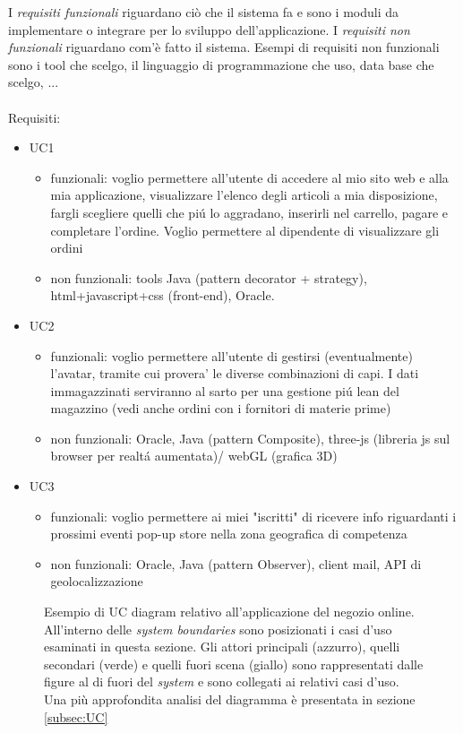 \documentclass[12pt]{article}
\begin{document}
I {\em requisiti funzionali} riguardano ciò che il sistema fa e sono i moduli da implementare o integrare per lo sviluppo dell’applicazione.
I {\em requisiti non funzionali} riguardano com’è fatto il sistema. Esempi di requisiti non funzionali sono i tool che scelgo, il linguaggio di programmazione che uso, data base che scelgo, ...
\\
\\
Requisiti:
\begin{itemize}
	\item UC1
		\begin{itemize}
		\item funzionali: voglio permettere all'utente di accedere al mio sito web e alla mia applicazione, visualizzare l'elenco degli articoli a mia disposizione, fargli scegliere quelli che pi\'u lo aggradano, inserirli nel carrello, pagare e completare l'ordine. Voglio permettere al dipendente di visualizzare gli ordini 
		\item non funzionali: tools Java (pattern decorator + strategy), html+javascript+css (front-end), Oracle. 
		\end{itemize}
	\item UC2
		\begin{itemize}
		\item funzionali: voglio permettere all'utente di gestirsi (eventualmente) l'avatar, tramite cui provera' le diverse combinazioni di capi. I dati immagazzinati serviranno al sarto per una gestione pi\'u lean del magazzino (vedi anche ordini con i fornitori di materie prime)
		\item non funzionali: Oracle, Java (pattern Composite), three-js (libreria js sul browser per realt\'a aumentata)/ webGL (grafica 3D)
		\end{itemize}
	\item UC3
		\begin{itemize}
		\item funzionali: voglio permettere ai miei "iscritti" di ricevere info riguardanti i prossimi eventi pop-up store nella zona geografica di competenza 
		\item non funzionali: Oracle, Java (pattern Observer), client mail, API di geolocalizzazione
		\end{itemize}
\end{itemize}


\vspace{1em}
\begin{figure}[ht]
  \centering
   \makebox[\textwidth][c]{}
  \caption{\small Esempio di UC diagram relativo all'applicazione del negozio online. All'interno delle {\em system boundaries} sono posizionati i casi d'uso esaminati in questa sezione. Gli attori principali (azzurro), quelli secondari (verde) e quelli fuori scena (giallo) sono rappresentati dalle figure al di fuori del {\em system} e sono collegati ai relativi casi d'uso. Una più approfondita analisi del diagramma è presentata in sezione \ref{subsec:UC}}
  \label{fig:UC_diagram}
\end{figure}
\end{document}
